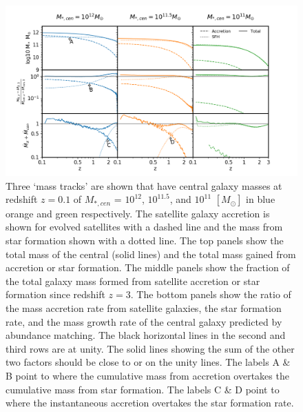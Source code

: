 \begin{figure}[h]
    \centering
    \includegraphics[width = \linewidth]{Figures/Chapter4/SatelliteAccretion_G19.png}
    \caption{Three `mass tracks' are shown that have central galaxy masses at redshift $z = 0.1$ of $M_{*,cen}$ = $10^{12}$, $10^{11.5}$, and $10^{11}$ $[M_{\odot}]$ in blue orange and green respectively. The satellite galaxy accretion is shown for evolved satellites with a dashed line and the mass from star formation shown with a dotted line. The top panels show the total mass of the central (solid lines) and the total mass gained from accretion or star formation. The middle panels show the fraction of the total galaxy mass formed from satellite accretion or star formation since redshift $z=3$. The bottom panels show the ratio of the mass accretion rate from satellite galaxies, the star formation rate, and the mass growth rate of the central galaxy predicted by abundance matching. The black horizontal lines in the second and third rows are at unity. The solid lines showing the sum of the other two factors should be close to or on the unity lines. The labels A \& B point to where the cumulative mass from accretion overtakes the cumulative mass from star formation. The labels C \& D point to where the instantaneous accretion overtakes the star formation rate.}
    \label{fig:SatelliteAccretion}
\end{figure}

